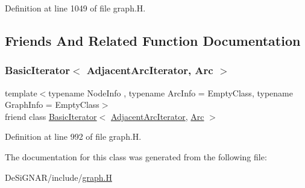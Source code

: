 Definition at line 1049 of file graph.\+H.



\subsection{Friends And Related Function Documentation}
\mbox{\label{class_designar_1_1_graph_1_1_adjacent_arc_iterator_a73ad70d76f3331ee4b07451db1347918}} 
\subsubsection{\texorpdfstring{Basic\+Iterator$<$ Adjacent\+Arc\+Iterator, Arc $>$}{BasicIterator< AdjacentArcIterator, Arc >}}
{\footnotesize\ttfamily template$<$typename Node\+Info , typename Arc\+Info  = Empty\+Class, typename Graph\+Info  = Empty\+Class$>$ \\
friend class \hyperlink{class_designar_1_1_basic_iterator}{Basic\+Iterator}$<$ \hyperlink{class_designar_1_1_graph_1_1_adjacent_arc_iterator}{Adjacent\+Arc\+Iterator}, \hyperlink{class_designar_1_1_graph_a74c730ef4ce2d20f998d72bd25c2b5bf}{Arc} $>$\hspace{0.3cm}{\ttfamily [friend]}}



Definition at line 992 of file graph.\+H.



The documentation for this class was generated from the following file\+:\begin{DoxyCompactItemize}
\item 
De\+Si\+G\+N\+A\+R/include/\hyperlink{graph_8_h}{graph.\+H}\end{DoxyCompactItemize}
